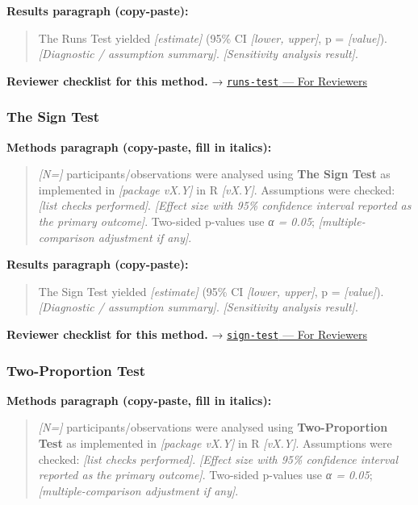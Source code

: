 \documentclass[
]{article}
\begin{document}
\textbf{Results paragraph (copy-paste):}

\begin{quote}
The Runs Test yielded \emph{{[}estimate{]}} (95\% CI \emph{{[}lower,
upper{]}}, p = \emph{{[}value{]}}). \emph{{[}Diagnostic / assumption
summary{]}}. \emph{{[}Sensitivity analysis result{]}}.
\end{quote}

\textbf{Reviewer checklist for this method.} →
\href{../chapters/04-inferential/runs-test.Rmd\#for-reviewers}{\texttt{runs-test}
--- For Reviewers}

\subsubsection{The Sign Test}\label{the-sign-test}

\textbf{Methods paragraph (copy-paste, fill in italics):}

\begin{quote}
\emph{{[}N={]}} participants/observations were analysed using
\textbf{The Sign Test} as implemented in \emph{{[}package vX.Y{]}} in R
\emph{{[}vX.Y{]}}. Assumptions were checked: \emph{{[}list checks
performed{]}}. \emph{{[}Effect size with 95\% confidence interval
reported as the primary outcome{]}}. Two-sided p-values use \emph{α =
0.05}; \emph{{[}multiple-comparison adjustment if any{]}}.
\end{quote}

\textbf{Results paragraph (copy-paste):}

\begin{quote}
The Sign Test yielded \emph{{[}estimate{]}} (95\% CI \emph{{[}lower,
upper{]}}, p = \emph{{[}value{]}}). \emph{{[}Diagnostic / assumption
summary{]}}. \emph{{[}Sensitivity analysis result{]}}.
\end{quote}

\textbf{Reviewer checklist for this method.} →
\href{../chapters/04-inferential/sign-test.Rmd\#for-reviewers}{\texttt{sign-test}
--- For Reviewers}

\subsubsection{Two-Proportion Test}\label{two-proportion-test}

\textbf{Methods paragraph (copy-paste, fill in italics):}

\begin{quote}
\emph{{[}N={]}} participants/observations were analysed using
\textbf{Two-Proportion Test} as implemented in \emph{{[}package vX.Y{]}}
in R \emph{{[}vX.Y{]}}. Assumptions were checked: \emph{{[}list checks
performed{]}}. \emph{{[}Effect size with 95\% confidence interval
reported as the primary outcome{]}}. Two-sided p-values use \emph{α =
0.05}; \emph{{[}multiple-comparison adjustment if any{]}}.
\end{quote}
\end{document}
